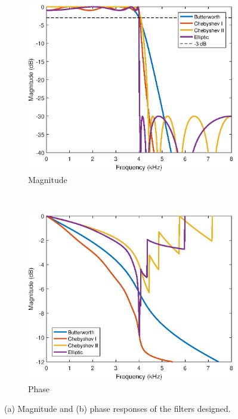 \documentclass{article}
\begin{document}
\FloatBarrier
\begin{figure}[h!]
	\centering
	\begin{subfigure}[h!]{0.5\textwidth}
		\includegraphics[width=\textwidth]{figs/classic_filters_mag.eps}
		\caption{Magnitude}
		\label{fig:mag}
	\end{subfigure}%
	~
	\begin{subfigure}[h!]{0.5\textwidth}
		\includegraphics[width=\textwidth]{figs/classic_filters_phase.eps}
		\caption{Phase}
		\label{fig:phase}
	\end{subfigure}
	\caption{(a) Magnitude and (b) phase responses of the filters designed.}\label{fig:q81a}
\end{figure}
\end{document}

